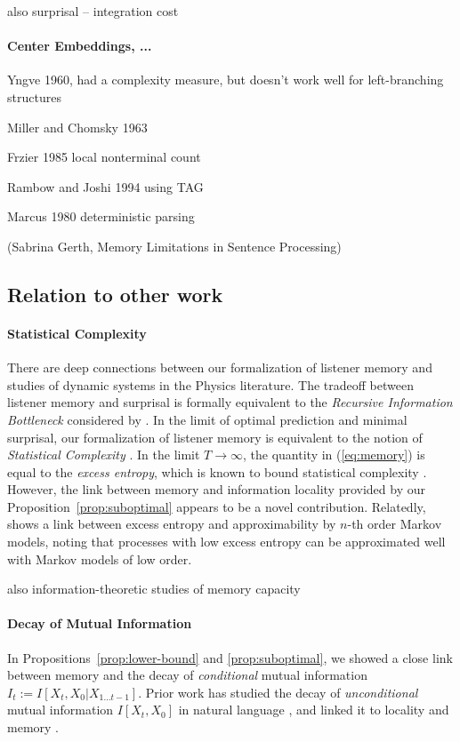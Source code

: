\documentclass[11pt,letterpaper]{article}
\begin{document}
also surprisal -- integration cost


\paragraph{Center Embeddings, ...}
Yngve 1960, had a complexity measure, but doesn't work well for left-branching structures

Miller and Chomsky 1963

Frzier 1985 local nonterminal count

Rambow and Joshi 1994 using TAG

Marcus 1980 deterministic parsing

(Sabrina Gerth, Memory Limitations in Sentence Processing)


\subsection{Relation to other work}

\paragraph{Statistical Complexity}
There are deep connections between our formalization of listener memory and studies of dynamic systems in the Physics literature.
The tradeoff between listener memory and surprisal is formally equivalent to the \emph{Recursive Information Bottleneck} considered by \cite{still-information-2014}.
In the limit of optimal prediction and minimal surprisal, our formalization of listener memory is equivalent to the notion of \emph{Statistical Complexity} \citep{crutchfield-inferring-1989}.
In the limit $T \rightarrow \infty$, the quantity in (\ref{eq:memory}) is equal to the \emph{excess entropy}, which is known to bound statistical complexity \citep{crutchfield-inferring-1989}.
However, the link between memory and information locality provided by our Proposition~\ref{prop:suboptimal} appears to be a novel contribution.
Relatedly, \cite{sharan-prediction-2016} shows a link between excess entropy and approximability by $n$-th order Markov models, noting that processes with low excess entropy can be approximated well with Markov models of low order.

also information-theoretic studies of memory capacity

\paragraph{Decay of Mutual Information}
In Propositions~\ref{prop:lower-bound} and \ref{prop:suboptimal}, we showed a close link between memory and the decay of \emph{conditional} mutual information $I_t := I[X_t, X_0 | X_{1\dots t-1}]$.
Prior work has studied the decay of \emph{unconditional} mutual information $I[X_t, X_0]$ in natural language \citep{ebeling-entropy-1994,lin-critical-2017}, and linked it to locality and memory \citep{futrell-noisy-context-2017}.
\end{document}
